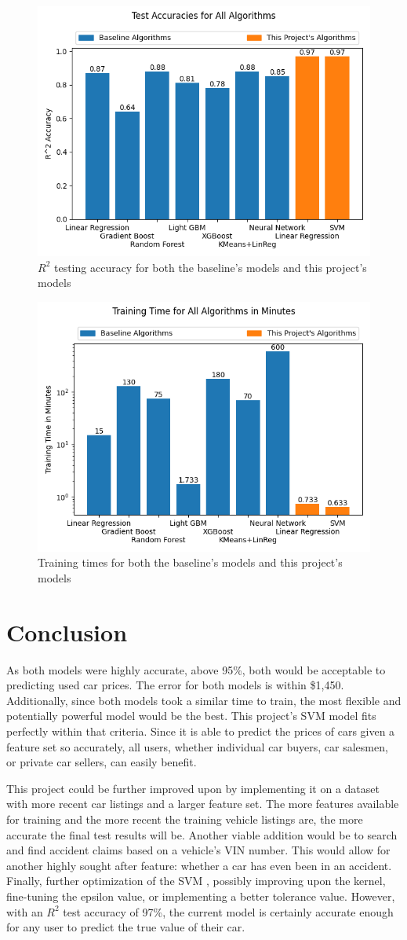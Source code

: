 \documentclass[compsoc]{IEEEtran}
\begin{document}
\begin{figure}[h]
    \centering
    \includegraphics[width=.48\textwidth]{images/results2.png}
    \caption{$R^2$ testing accuracy for both the baseline's models and this project's models}
    \label{fig:results2}
\end{figure}

\begin{figure}[h]
    \centering
    \includegraphics[width=.48\textwidth]{images/results3.png}
    \caption{Training times for both the baseline's models and this project's models}
    \label{fig:results3}
\end{figure}


\section{Conclusion} 
As both models were highly accurate, above 95\%, both would be acceptable to predicting used car prices. The error for both models is within \$1,450. Additionally, since both models took a similar time to train, the most flexible and potentially powerful model would be the best. This project's SVM \cite{model:svm} model fits perfectly within that criteria. Since it is able to predict the prices of cars given a feature set so accurately, all users, whether individual car buyers, car salesmen, or private car sellers, can easily benefit. 

This project could be further improved upon by implementing it on a dataset with more recent car listings and a larger feature set. The more features available for training and the more recent the training vehicle listings are, the more accurate the final test results will be. Another viable addition would be to search and find accident claims based on a vehicle's VIN number. This would allow for another highly sought after feature: whether a car has even been in an accident. Finally, further optimization of the SVM \cite{model:svm}, possibly improving upon the kernel, fine-tuning the epsilon value, or implementing a better tolerance value. However, with an $R^2$ test accuracy of 97\%, the current model is certainly accurate enough for any user to predict the true value of their car.



\end{document}
